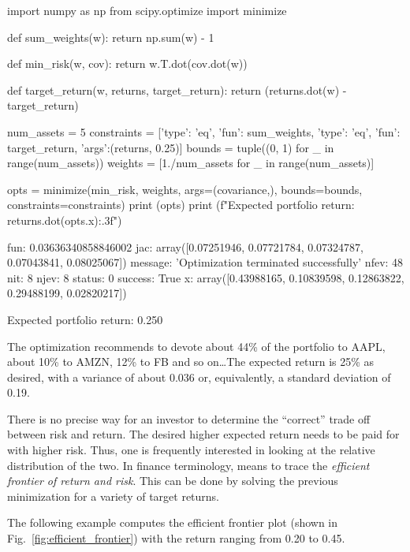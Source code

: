 \begin{ipython}
import numpy as np
from scipy.optimize import minimize

def sum_weights(w): 
    return np.sum(w) - 1

def min_risk(w, cov):
    return w.T.dot(cov.dot(w))

def target_return(w, returns, target_return): 
    return (returns.dot(w) - target_return)

num_assets = 5
constraints = [{'type': 'eq', 'fun': sum_weights},
               {'type': 'eq', 'fun': target_return, 'args':(returns, 0.25)}] 
bounds = tuple((0, 1) for _ in range(num_assets))
weights = [1./num_assets for _ in range(num_assets)]

opts = minimize(min_risk, weights, args=(covariance,),
                bounds=bounds, constraints=constraints)
print (opts)
print (f"Expected portfolio return: {returns.dot(opts.x):.3f}")
\end{ipython}
\begin{ioutput}
     fun: 0.03636340858846002
     jac: array([0.07251946, 0.07721784, 0.07324787, 0.07043841, 0.08025067])
 message: 'Optimization terminated successfully'
    nfev: 48
     nit: 8
    njev: 8
  status: 0
 success: True
       x: array([0.43988165, 0.10839598, 0.12863822, 0.29488199, 0.02820217])
       
Expected portfolio return: 0.250
\end{ioutput}

The optimization recommends to devote about 44\% of the portfolio to AAPL, about 10\% to AMZN, 12\% to FB and so on\ldots The expected return is 25\% as desired, with a variance of about 0.036 or, equivalently, a standard deviation of 0.19.


There is no precise way for an investor to determine the “correct” trade off between risk and return. The desired higher expected return needs to be paid for with higher risk. Thus, one is frequently interested in looking at the relative distribution of the two.
In finance terminology, means to trace the \emph{efficient frontier of return and risk}. This can be done by solving the previous minimization for a variety of target returns.

The following example computes the efficient frontier plot (shown in Fig.~\ref{fig:efficient_frontier}) with the return ranging from 0.20 to 0.45.

